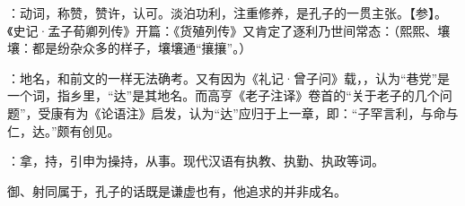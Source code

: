 {
\item {}：动词，称赞，赞许，认可。淡泊功利，注重修养，是孔子的一贯主张。【参】。《史记·孟子荀卿列传》开篇：《货殖列传》又肯定了逐利乃世间常态：（熙熙、壤壤：都是纷杂众多的样子，壤壤通“攘攘”。）
}
{}  %


{
\begin{lyitemize}
\item {}：地名，和前文的一样无法确考。又有因为《礼记·曾子问》载，，认为“巷党”是一个词，指乡里，“达”是其地名。而高亨《老子注译》卷首的“关于老子的几个问题”，受康有为《论语注》启发，认为“达”应归于上一章，即：“子罕言利，与命与仁，达。”颇有创见。%

\item {}：拿，持，引申为操持，从事。现代汉语有执教、执勤、执政等词。
\end{lyitemize}
御、射同属于，孔子的话既是谦虚也有，他追求的并非成名。
}
{}



